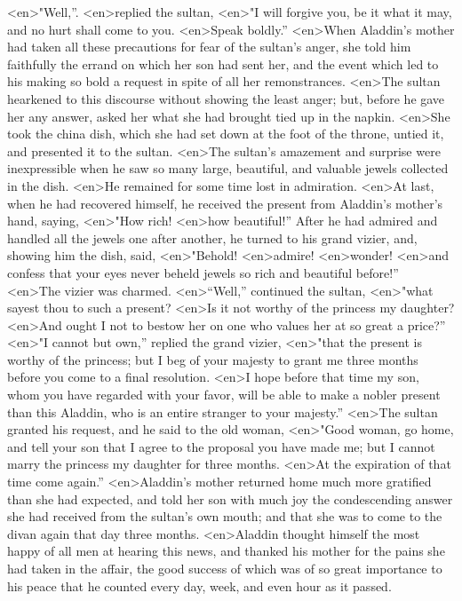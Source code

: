 <en>"Well,”.
<en>replied the sultan,
<en>"I will forgive you, be it what it may, and no hurt shall come to you.
<en>Speak boldly.”
<en>When Aladdin’s mother had taken all these precautions for fear of the sultan’s anger, she told him faithfully the errand on which her son had sent her, and the event which led to his making so bold a request in spite of all her remonstrances.
<en>The sultan hearkened to this discourse without showing the least anger; but, before he gave her any answer, asked her what she had brought tied up in the napkin.
<en>She took the china dish, which she had set down at the foot of the throne, untied it, and presented it to the sultan.
<en>The sultan’s amazement and surprise were inexpressible when he saw so many large, beautiful, and valuable jewels collected in the dish.
<en>He remained for some time lost in admiration.
<en>At last, when he had recovered himself, he received the present from Aladdin’s mother’s hand, saying,
<en>"How rich!
<en>how beautiful!” After he had admired and handled all the jewels one after another, he turned to his grand vizier, and, showing him the dish, said,
<en>"Behold!
<en>admire!
<en>wonder!
<en>and confess that your eyes never beheld jewels so rich and beautiful before!”
<en>The vizier was charmed.
<en>“Well,” continued the sultan,
<en>"what sayest thou to such a present?
<en>Is it not worthy of the princess my daughter?
<en>And ought I not to bestow her on one who values her at so great a price?”
<en>"I cannot but own,” replied the grand vizier,
<en>"that the present is worthy of the princess; but I beg of your majesty to grant me three months before you come to a final resolution.
<en>I hope before that time my son, whom you have regarded with your favor, will be able to make a nobler present than this Aladdin, who is an entire stranger to your majesty.”
<en>The sultan granted his request, and he said to the old woman,
<en>"Good woman, go home, and tell your son that I agree to the proposal you have made me; but I cannot marry the princess my daughter for three months.
<en>At the expiration of that time come again.”
<en>Aladdin’s mother returned home much more gratified than she had expected, and told her son with much joy the condescending answer she had received from the sultan’s own mouth; and that she was to come to the divan again that day three months.
<en>Aladdin thought himself the most happy of all men at hearing this news, and thanked his mother for the pains she had taken in the affair, the good success of which was of so great importance to his peace that he counted every day, week, and even hour as it passed.
